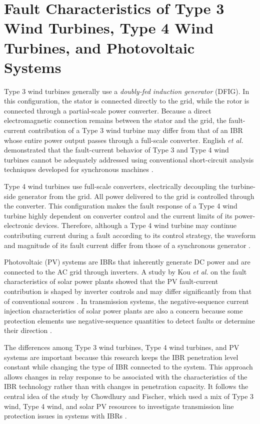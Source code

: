 \section{Fault Characteristics of Type 3 Wind Turbines, Type 4 Wind Turbines, and Photovoltaic Systems}

Type 3 wind turbines generally use a \textit{doubly-fed induction generator} (DFIG). In this configuration, the stator is connected directly to the grid, while the rotor is connected through a partial-scale power converter. Because a direct electromagnetic connection remains between the stator and the grid, the fault-current contribution of a Type 3 wind turbine may differ from that of an IBR whose entire power output passes through a full-scale converter. English \textit{et al.} demonstrated that the fault-current behavior of Type 3 and Type 4 wind turbines cannot be adequately addressed using conventional short-circuit analysis techniques developed for synchronous machines \cite{english2011current_contributions}.

Type 4 wind turbines use full-scale converters, electrically decoupling the turbine-side generator from the grid. All power delivered to the grid is controlled through the converter. This configuration makes the fault response of a Type 4 wind turbine highly dependent on converter control and the current limits of its power-electronic devices. Therefore, although a Type 4 wind turbine may continue contributing current during a fault according to its control strategy, the waveform and magnitude of its fault current differ from those of a synchronous generator \cite{english2011current_contributions,ieeenerc2018tr68}.

Photovoltaic (PV) systems are IBRs that inherently generate DC power and are connected to the AC grid through inverters. A study by Kou \textit{et al.} on the fault characteristics of solar power plants showed that the PV fault-current contribution is shaped by inverter controls and may differ significantly from that of conventional sources \cite{kou2020fault}. In transmission systems, the negative-sequence current injection characteristics of solar power plants are also a concern because some protection elements use negative-sequence quantities to detect faults or determine their direction \cite{kou2020negative_sequence,haddadi2021negative_sequence_elements}.

The differences among Type 3 wind turbines, Type 4 wind turbines, and PV systems are important because this research keeps the IBR penetration level constant while changing the type of IBR connected to the system. This approach allows changes in relay response to be associated with the characteristics of the IBR technology rather than with changes in penetration capacity. It follows the central idea of the study by Chowdhury and Fischer, which used a mix of Type 3 wind, Type 4 wind, and solar PV resources to investigate transmission line protection issues in systems with IBRs \cite{chowdhury2021tlp1}.

